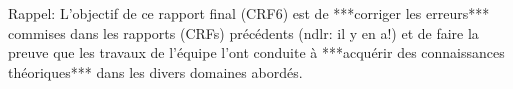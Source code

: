 Rappel: L'objectif de ce rapport final (CRF6) est de
         ***corriger les erreurs***
commises dans les rapports (CRFs) précédents (ndlr: il y en a!) et de
faire la preuve que les travaux de l'équipe l'ont conduite à
         ***acquérir des connaissances théoriques***
dans les divers domaines abordés.
